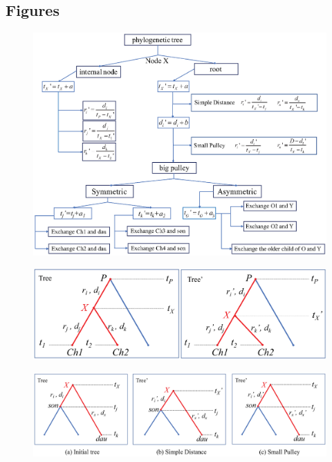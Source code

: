 \documentclass{bmcart}
\begin{document}
\begin{backmatter}

\section*{Figures}
\begin{figure}[h!]
\includegraphics[width=12cm]{flowchart.eps}\\
\caption{
              }
\label{flowchart}
\end{figure}

\begin{figure}[h!]
\includegraphics[width=12cm]{internalnodes.eps}\\
\caption{
             }
\label{internalnodes}
\end{figure}

\begin{figure}[h!]
\includegraphics[width=12cm]{rootstrategy.eps}\\
\caption{
             }
\label{simpledistance}
\end{figure}



\end{backmatter}
\end{document}
